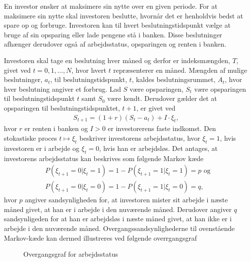 En investor ønsker at maksimere sin nytte over en given periode. For at maksimere sin nytte skal investoren beslutte, hvornår det er henholdvis bedst at spare op og forbruge. Investoren kan til hvert beslutningstidspunkt vælge at bruge af sin opsparing eller lade pengene stå i banken. Disse beslutninger afhænger derudover også af arbejdsstatus, opsparingen og renten i banken.

Investoren skal tage en beslutning hver måned og derfor er indeksmængden, $T$, givet ved $t = 0,1,\ldots, N$, hvor hvert $t$ repræsenterer en måned. Mængden af mulige beslutninger, $a_t$, til beslutningstidspunkt, $t$, kaldes beslutningsrummet, $A_t$, hvor hver beslutning angiver et forbrug. Lad $S$ være opsparingen, $S_t$ være opsparingen til beslutningstidspunkt $t$ samt $S_0$ være kendt. Derudover gælder det at opsparingen til beslutningstidspunktet, $t+1$, er givet ved
\begin{align*}
    S_{t+1}=(1+r)(S_t-a_t)+I \cdot \xi_t,
\end{align*}
hvor $r$ er renten i banken og $I>0$ er investorerens faste indkomst. Den stokastiske proces $t\mapsto \xi_t$ beskriver investorens arbejdsstatus, hvor $\xi_t=1$, hvis investoren er i arbejde og $\xi_t=0$, hvis han er arbejdsløs. Det antages, at investorens arbejdsstatus kan beskrives som følgende Markov kæde
\begin{align*}
    &P(\xi_{t+1}=0|\xi_t=1)=1-P(\xi_{t+1}=1|\xi_t=1)=p \text{ og }\\
    &P(\xi_{t+1}=0|\xi_t=0)=1-P(\xi_{t+1}=1|\xi_t=0)=q,
\end{align*}
hvor $p$ angiver sandsynligheden for, at investoren mister sit arbejde i næste måned givet, at han er i arbejde i den nuværende måned. Derudover angiver $q$ sandsynligeden for at han er arbejdsløs i næste måned givet, at han ikke er i arbejde i den nuværende måned. Overgangssandsynlighederne til ovenstående Markov-kæde kan dermed illustreres ved følgende overrgangsgraf
\begin{figure}[H]
    \centering
    \caption{Overgangsgraf for arbejdsstatus}
    \label{fig:overgangsgraf_for_arbejdsstatus}
\end{figure}

